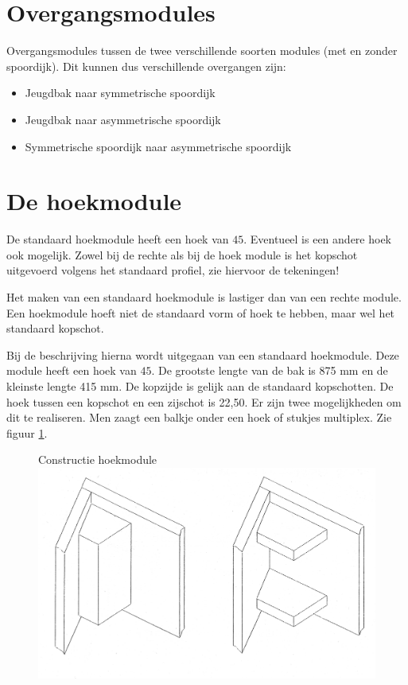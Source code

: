 \documentclass[12pt,a4paper]{report}
\begin{document}
\section{Overgangsmodules}
Overgangsmodules tussen de twee verschillende soorten modules (met en zonder spoordijk). Dit kunnen dus verschillende overgangen zijn:
\begin{itemize}
\item Jeugdbak naar symmetrische spoordijk
\item Jeugdbak naar asymmetrische spoordijk
\item Symmetrische spoordijk naar asymmetrische spoordijk
\end{itemize}

\section{De hoekmodule}
De standaard hoekmodule heeft een hoek van $45$\textdegree. Eventueel is een andere hoek ook mogelijk.
Zowel bij de rechte als bij de hoek module is het kopschot uitgevoerd volgens het standaard profiel, zie hiervoor de tekeningen!

Het maken van een standaard hoekmodule is lastiger dan van een rechte module. Een hoekmodule hoeft niet de standaard vorm of hoek te hebben, maar wel het standaard kopschot.

Bij de beschrijving hierna wordt uitgegaan van een standaard hoekmodule. Deze module heeft een hoek van $45$\textdegree. De grootste lengte van de bak is 875 mm en de kleinste lengte 415 mm. De kopzijde is gelijk aan de standaard kopschotten.
De hoek tussen een kopschot en een zijschot is 22,50. Er zijn twee mogelijkheden om dit te realiseren. Men zaagt een balkje onder een hoek of stukjes multiplex. Zie figuur \ref{figuur4}.

\begin{figure}[!ht]
  \captionbox
  {Constructie hoekmodule\label{figuur4}}
  {\includegraphics[scale=0.2]{images/rcu_figuur4}}
\end{figure}
\end{document}
